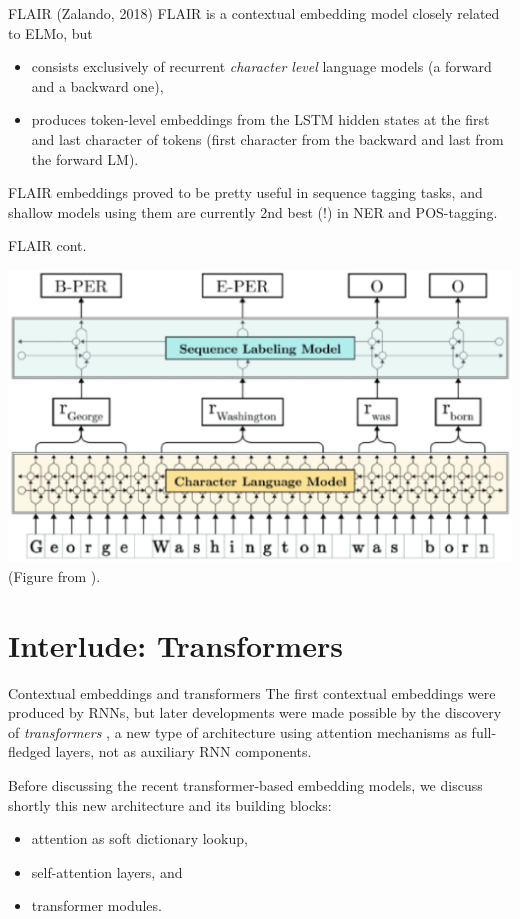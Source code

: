 \documentclass[style=upen, size=14pt]{powerdot}
\newcommand{\gold}{\color{arany}}
\theoremstyle{definition}
\begin{document}
\begin{slide}[toc=FLAIR]{FLAIR (Zalando, 2018)}
  FLAIR \citep{akbik2018contextual} is a contextual embedding model closely
  related to ELMo, but 
  \begin{itemize}
  \item consists exclusively of recurrent \emph{character level} language models
    (a forward and a backward one),
  \item produces token-level embeddings from the LSTM hidden states at the
    first and last character of tokens (first character from the backward and
    last from the forward LM).
  \end{itemize}
  FLAIR embeddings proved to be pretty useful in sequence tagging tasks, and
  shallow models using them are currently 2nd best (!) in NER and POS-tagging.
\end{slide}

\begin{slide}[toc=]{FLAIR cont.}
  \begin{center}
    \includegraphics[width=1\textwidth]{figures/flair.eps}
    \footnotesize{(Figure from \cite{akbik2018contextual}).}
  \end{center}
\end{slide}

\section[toc=Transformers]{Interlude: Transformers}

\begin{slide}[toc=Introduction]{Contextual embeddings and transformers}
  The first contextual embeddings were produced by RNNs, but later developments
  were made possible by the discovery of \emph{\gold transformers}
  \citep{vaswani2017attention}, a new type of architecture using attention
  mechanisms as full-fledged layers, not as auxiliary RNN components.\bigskip

  Before discussing the recent transformer-based embedding models, we discuss
  shortly this new architecture and its building blocks:
  \begin{itemize}
  \item attention as soft dictionary lookup,
  \item self-attention layers, and
  \item transformer modules.
  \end{itemize}
\end{slide}
\end{document}

